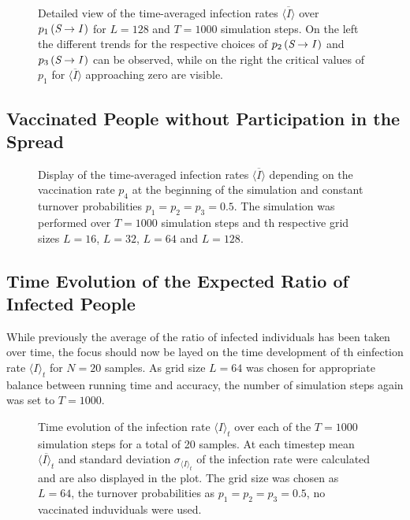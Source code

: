 \begin{figure}[ht]
    \centering
    \resizebox{\textwidth}{!}{}
    \caption{Detailed view of the time-averaged infection rates $\overline{\langle I\rangle}$ over $p_1\left(\textit{S}\rightarrow\textit{I}\,\right)$ for $L=128$ and $T=1000$ simulation steps. On the left the different
    trends for the respective choices of $p_2\left(\textit{S}\rightarrow\textit{I}\,\right)$ and $p_3\left(\textit{S}\rightarrow\textit{I}\,\right)$ can be observed, 
    while on the right the critical values of $p_1$ for $\overline{\langle I\rangle}$ approaching zero are visible.}\label{fig:Res_Dis_Avg_Inf_over_p1_L128}
\end{figure}

\subsection{Vaccinated People without Participation in the Spread}

\begin{figure}[ht]
    \centering
    \resizebox{\textwidth}{!}{}
    \caption{Display of the time-averaged infection rates $\overline{\langle I\rangle}$ depending on the vaccination rate $p_4$ at the beginning of the simulation and constant turnover probabilities
    $p_1=p_2=p_3=0.5$. The simulation was performed over $T=1000$ simulation steps and th respective grid sizes $L=16$, $L=32$, $L=64$ and $L=128$.}\label{fig:Res_Dis_Avg_Inf_over_p4}
\end{figure}

\subsection{Time Evolution of the Expected Ratio of Infected People}

While previously the average of the ratio of infected individuals has been taken over time, the focus should now be layed on the time development of th einfection rate $\langle I\rangle_t$ for $N=20$ samples.
As grid size $L=64$ was chosen for appropriate balance between running time and accuracy, the number of simulation steps again was set to $T=1000$.


\begin{figure}[ht]
    \centering
    \resizebox{\textwidth}{!}{}
    \caption{Time evolution of the infection rate $\langle I\rangle_t$ over each of the $T=1000$ simulation steps for a total of 20 samples. At each timestep mean $\overline{\langle I\rangle_t}$
    and standard deviation $\sigma_{\langle I\rangle_t}$ of the infection rate were calculated and are also displayed in the plot. The grid size was chosen as $L=64$, the turnover probabilities
    as $p_1=p_2=p_3=0.5$, no vaccinated induviduals were used.}\label{fig:Avg_Inf_over_t}
\end{figure}

